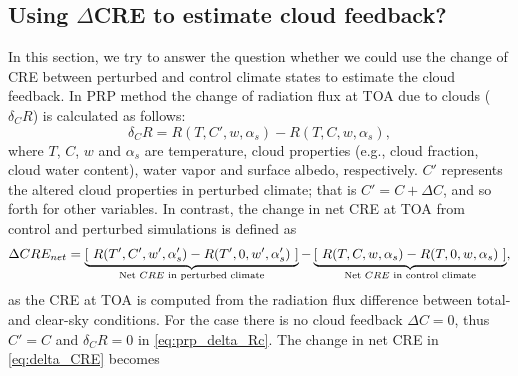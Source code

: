 \subsection{Using $\Delta$CRE to estimate cloud feedback?}
\label{sec:CRE_or_PRP}

In this section, we try to answer the question whether we could use the change of CRE between perturbed and control climate states to estimate the cloud feedback.
In PRP method the change of radiation flux at TOA due to clouds ($\delta_C {R}$) is calculated as follows:
\begin{equation}
    \delta_C R = {R}(T, C', w, \alpha_s)  - {R}(T, C, w, \alpha_s),
    \label{eq:prp_delta_Rc}
\end{equation}
where $T$, $C$, $w$ and $\alpha_s$ are temperature, cloud properties (e.g., cloud fraction, cloud water content), water vapor and surface albedo, respectively. $C'$ represents the altered cloud properties in perturbed climate; that is $C'=C+\Delta C$, and so forth for other variables. 
In contrast, the change in net CRE at TOA from control and perturbed simulations is defined as
\begin{equation}
    \Delta CRE_{net} = \underbrace{\left[~{R}(T', C', w', \alpha'_s)  - {R}(T', 0, w', \alpha'_s) ~\right]}_\text{\textcolor{black}{Net $CRE$ in perturbed climate}} - 
    \underbrace{\left[~{R}(T, C, w, \alpha_s)  - {R}(T, 0, w, \alpha_s) ~\right]}_\text{\textcolor{black}{Net $CRE$ in control climate}},
    \label{eq:delta_CRE}
\end{equation}
as the CRE at TOA is computed from the radiation flux difference between total- and clear-sky conditions. For the case there is no cloud feedback $\Delta C=0$, thus $C'=C$ and $\delta_C {R}=0$ in \eqref{eq:prp_delta_Rc}. The change in net CRE in \eqref{eq:delta_CRE} becomes
